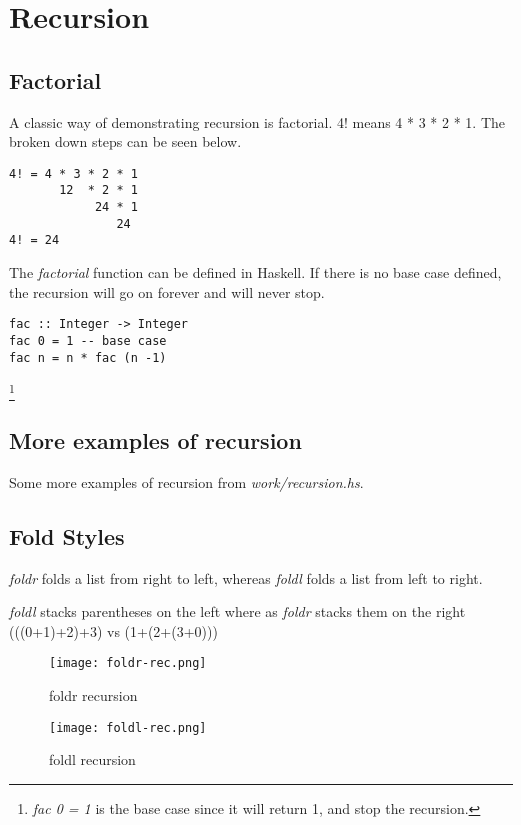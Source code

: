 \section{Recursion}

\subsection{Factorial}
A classic way of demonstrating recursion is factorial. 4! means
4 * 3 * 2 * 1. The broken down steps can be seen below.

\begin{verbatim}
4! = 4 * 3 * 2 * 1
       12  * 2 * 1
            24 * 1
               24
4! = 24
\end{verbatim}

The \emph{factorial} function can be defined in Haskell.
If there is no base case defined, the recursion will go on forever and will never stop.

\begin{lstlisting}
fac :: Integer -> Integer
fac 0 = 1 -- base case
fac n = n * fac (n -1)
\end{lstlisting}

\footnote{\emph{fac 0 = 1} is the base case since it will return 1, and stop the recursion.}

\subsection{More examples of recursion}
Some more examples of recursion from \emph{work/recursion.hs}.



\newpage

\subsection{Fold Styles}
\emph{foldr} folds a list from right to left, whereas \emph{foldl} folds
a list from left to right.

\emph{foldl} stacks parentheses on the left where as \emph{foldr} stacks them on the right
(((0+1)+2)+3) vs (1+(2+(3+0)))

\begin{figure}[h]
\texttt{[image: foldr-rec.png]}
\centering
\caption{foldr recursion}
\end{figure}

\begin{figure}[h]
\texttt{[image: foldl-rec.png]}
\centering
\caption{foldl recursion}
\end
{figure}
